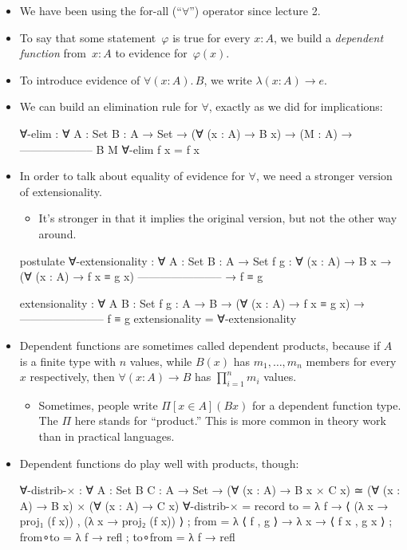 \documentclass{lecturenotes}
\begin{document}
\begin{itemize}
\item We have been using the for-all (``$\forall$'') operator since lecture 2.
\item To say that some statement~$\varphi$ is true for every $x \colon A$, we build a \emph{dependent function} from~$x \colon A$ to evidence for~$\varphi(x)$.
\item To introduce evidence of $\forall (x \colon A).\,B$, we write $\lambda (x \colon A) \to e$.
\item We can build an elimination rule for $\forall$, exactly as we did for implications:
\begin{code}
∀-elim : ∀ {A : Set} {B : A → Set} →
  (∀ (x : A) → B x) →
       (M : A) →
  --------------------
         B M
∀-elim f x = f x    
\end{code}
\item In order to talk about equality of evidence for $\forall$, we need a stronger version of extensionality.
  \begin{itemize}
  \item It's stronger in that it implies the original version, but not the other way around.
  \end{itemize}
\begin{code}
postulate
  ∀-extensionality : ∀ {A : Set} {B : A → Set} {f g : ∀ (x : A) → B x}
    → (∀ (x : A) → f x ≡ g x)
      -----------------------
    → f ≡ g

extensionality : ∀ {A B : Set} {f g : A → B} →
  (∀ (x : A) → f x ≡ g x) →
  -----------------------
          f ≡ g
extensionality = ∀-extensionality    
\end{code}
\item Dependent functions are sometimes called dependent products, because if $A$ is a finite type with $n$ values, while $B(x)$ has $m_1, \dots, m_n$ members for every $x$ respectively, then $\forall (x \colon A) \to B$ has $\prod^n_{i = 1} m_i$ values.
  \begin{itemize}
  \item Sometimes, people write $\Pi[ x \in A ] (B x)$ for a dependent function type.
    The $\Pi$ here stands for ``product.''
    This is more common in theory work than in practical languages.
  \end{itemize}
\item Dependent functions do play well with products, though:
\begin{code}
∀-distrib-× : ∀ {A : Set} {B C : A → Set} →
  (∀ (x : A) → B x × C x) ≃ (∀ (x : A) → B x) × (∀ (x : A) → C x)
∀-distrib-× =
  record
  {
    to      = λ f → ⟨ (λ {x → proj₁ (f x)}) , (λ {x → proj₂ (f x)}) ⟩
  ; from    = λ { ⟨ f , g ⟩ → λ x → ⟨ f x , g x ⟩}
  ; from∘to = λ f → refl
  ; to∘from = λ f → refl
  }    
\end{code}
\end{itemize}
\end{document}
